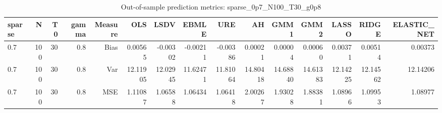 \begin{table}[!htbp]\centering
\caption{Out-of-sample prediction metrics: sparse_0p7_N100_T30_g0p8}
\label{tab:table3_sparse_0p7_N100_T30_g0p8}
\begin{tabular}{lrrrrrrrrrrrrrr}
\hline
sparse & N & T0 & gamma & Measure & OLS & LSDV & EBMLE & URE & AH & GMM1 & GMM2 & LASSO & RIDGE & ELASTIC_NET \\
\hline
0.7 & 100 & 30 & 0.8 & Bias & 0.00565 & -0.00302 & -0.00211 & -0.00386 & 0.00021 & 0.00004 & 0.00060 & 0.00371 & 0.00514 & 0.00373 \\
0.7 & 100 & 30 & 0.8 & Var & 12.11905 & 12.02945 & 11.62471 & 11.81064 & 14.80418 & 14.68840 & 14.61383 & 12.14225 & 12.14562 & 12.14206 \\
0.7 & 100 & 30 & 0.8 & MSE & 1.11087 & 1.06588 & 1.06434 & 1.06418 & 2.00267 & 1.93028 & 1.88381 & 1.08966 & 1.09953 & 1.08977 \\
\hline
\end{tabular}
\end{table}


